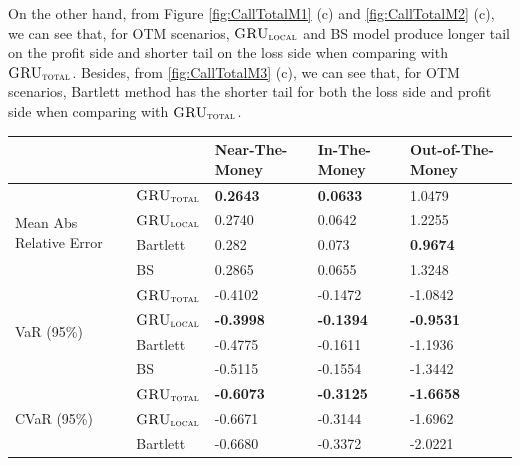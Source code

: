 \documentclass[letterpaper,12pt,titlepage,oneside,final]{book}
\numberwithin{equation}{section}
\theoremstyle{definition}
\newcommand{\modelT}{\textsc{GRU}_{\textsc{total}}}
\newcommand{\modelL}{\textsc{GRU}_{\textsc{local}}}
\begin{document}
On the other hand, from Figure \ref{fig:CallTotalM1} (c) and \ref{fig:CallTotalM2} (c), we can see that, for OTM scenarios, $\modelL$ and BS model produce longer tail on the profit side and  shorter tail on the loss side when comparing with $\modelT$. Besides, from \ref{fig:CallTotalM3} (c), we can see that, for OTM scenarios, Bartlett method has the shorter tail for both the loss side and profit side when comparing with $\modelT$. 
\begin{table}[htp!]
	\centering
	\begin{tabular}{ll|l|l|l|}
		\cline{3-5}
		&          & Near-The-Money   & In-The-Money     & Out-of-The-Money \\ \hline
		\multicolumn{1}{|l|}{\multirow{4}{*}{Mean Abs Relative Error}} & $\modelT$    & \textbf{0.2643}  & \textbf{0.0633}  & 1.0479           \\  
		\multicolumn{1}{|l|}{}                                & $\modelL$    & 0.2740           & 0.0642           & 1.2255           \\  
		\multicolumn{1}{|l|}{}                                & Bartlett & 0.282            & 0.073            & \textbf{0.9674}  \\  
		\multicolumn{1}{|l|}{}                                & BS       & 0.2865           & 0.0655           & 1.3248           \\ \hline
		\multicolumn{1}{|l|}{\multirow{4}{*}{VaR (95\%)}}     & $\modelT$    & -0.4102          & -0.1472          & -1.0842          \\  
		\multicolumn{1}{|l|}{}                                & $\modelL$    & \textbf{-0.3998} & \textbf{-0.1394} & \textbf{-0.9531} \\  
		\multicolumn{1}{|l|}{}                                & Bartlett & -0.4775          & -0.1611          & -1.1936          \\  
		\multicolumn{1}{|l|}{}                                & BS       & -0.5115          & -0.1554          & -1.3442          \\ \hline
		\multicolumn{1}{|l|}{\multirow{4}{*}{CVaR (95\%)}}    & $\modelT$    & \textbf{-0.6073} & \textbf{-0.3125} & \textbf{-1.6658} \\  
		\multicolumn{1}{|l|}{}                                & $\modelL$    & -0.6671          & -0.3144          & -1.6962          \\  
		\multicolumn{1}{|l|}{}                                & Bartlett & -0.6680          & -0.3372          & -2.0221          \\  

\end{tabular}
\end{table}
\end{document}
